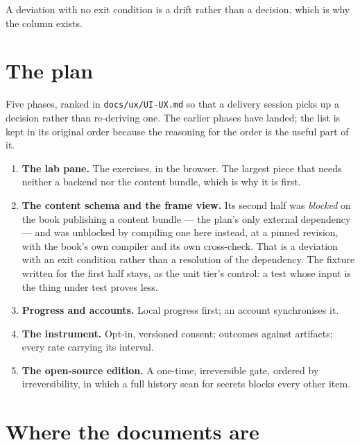 \documentclass[11pt,a4paper]{article}
\begin{document}
A deviation with no exit condition is a drift rather than a decision, which is why the
column exists.

\section{The plan}

Five phases, ranked in \texttt{docs/ux/UI-UX.md} so that a delivery session picks up a decision
rather than re-deriving one. The earlier phases have landed; the list is kept in its original
order because the reasoning for the order is the useful part of it.

\begin{enumerate}[leftmargin=2em,itemsep=2pt]
  \item \textbf{The lab pane.} The exercises, in the browser. The largest piece that needs
        neither a backend nor the content bundle, which is why it is first.
  \item \textbf{The content schema and the frame view.} Its second half was \emph{blocked} on
        the book publishing a content bundle --- the plan's only external dependency --- and
        was unblocked by compiling one here instead, at a pinned revision, with the book's own
        compiler and its own cross-check. That is a deviation with an exit condition rather
        than a resolution of the dependency. The fixture written for the first half stays, as
        the unit tier's control: a test whose input is the thing under test proves less.
  \item \textbf{Progress and accounts.} Local progress first; an account synchronises it.
  \item \textbf{The instrument.} Opt-in, versioned consent; outcomes against artifacts; every
        rate carrying its interval.
  \item \textbf{The open-source edition.} A one-time, irreversible gate, ordered by
        irreversibility, in which a full history scan for secrets blocks every other item.
\end{enumerate}

\section{Where the documents are}
\end{document}
